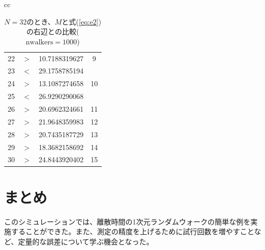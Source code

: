 \documentclass{jsarticle}
\begin{document}
\begin{enumerate}
\begin{enumerate}
\begin{table}[H]
\begin{center}
\begin{tabular}{cc}
\begin{minipage}{0.5\hsize}
\begin{center}
\begin{tabular}{rcl|c}
                                        22 & $>$ & 10.7188319627 & 9 \\
                                        23 & $<$ & 29.1758785194 & \\
                                        24 & $>$ & 13.1087274658 & 10 \\
                                        25 & $<$ & 26.9290290068 & \\
                                        26 & $>$ & 20.6962324661 & 11 \\
                                        27 & $>$ & 21.9648359983 & 12 \\
                                        28 & $>$ & 20.7435187729 & 13 \\
                                        29 & $>$ & 18.3682158692 & 14 \\
                                        30 & $>$ & 24.8443920402 & 15 \\ \hline
                                    \end{tabular}
                                    \caption{$N=32$のとき、$M$と式(\ref{eq:e2})の右辺との比較($\mathrm{nwalkers}=1000$)}  
                                    \label{t2}
                                    \end{center}
                                \end{minipage}
                                
                            \end{tabular}
                        \end{center}
                    \end{table}
                            
                \end{enumerate} 
            
        \end{enumerate}
    
    \section{まとめ}
        このシミュレーションでは、離散時間の1次元ランダムウォークの簡単な例を実施することができた。また、測定の精度を上げるために試行回数を増やすことなど、定量的な誤差について学ぶ機会となった。
\end{document}
